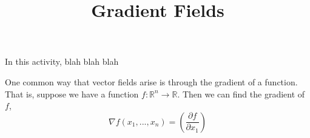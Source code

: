 \documentclass{ximera}
\title{Gradient Fields}
\begin{document}
\begin{abstract}
\end{abstract}
\maketitle

In this activity, blah blah blah


One common way that vector fields arise is through the gradient of a function. That is, suppose we have a function $f:\mathbb{R}^n\rightarrow\mathbb{R}$. Then we can find the gradient of $f$,
\[
\nabla f(x_1,...,x_n) =\left(\dfrac{\partial f}{\partial x_1} \right)
\]
\end{document}
